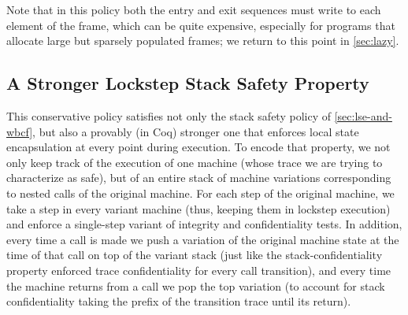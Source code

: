 \documentclass[acmsmall,review,anonymous]{acmart}\settopmatter{printfolios=true,printccs=false,printacmref=false}
\begin{document}
{Note that in this policy both the entry and exit sequences
must write to each element of
the frame, which can be quite expensive, especially for programs that
allocate large but sparsely populated frames; we return to this point
in \cref{sec:lazy}.
%



\subsection{A Stronger Lockstep Stack Safety Property}
\label{sec:lockstep}


This conservative policy satisfies not only the stack safety policy of
\cref{sec:lse-and-wbcf},
but also a provably (in Coq) stronger one that enforces local state
encapsulation at every point during execution. To encode that
property, we not only keep track of the execution of one machine
(whose trace we are trying to characterize as safe), but of an entire
stack of machine variations corresponding to nested calls of the
original machine. For each step of the original machine, we take a
step in every variant machine (thus, keeping them in lockstep
execution) and enforce a single-step variant of integrity and
confidentiality tests. In addition, every time a call is made we push
a variation of the original machine state at the time of that call on
top of the variant stack (just like the stack-confidentiality property
enforced trace confidentiality for every call transition), and every time
the machine returns from a call we pop the top variation (to account
for stack confidentiality taking the prefix of the transition trace
until its return).

}
\end{document}
